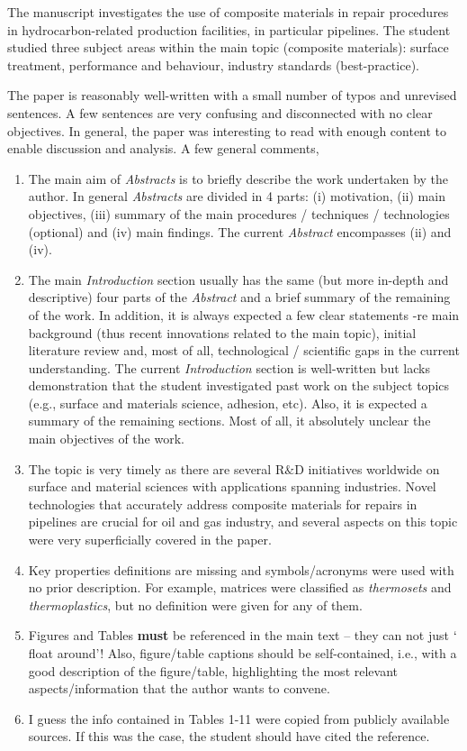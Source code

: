 \documentclass[14pt,twoside]{report}
\begin{document}
\medskip

The manuscript investigates the use of composite materials in repair procedures in hydrocarbon-related production facilities, in particular pipelines. The student studied three subject areas within the main topic (composite materials): surface treatment, performance and behaviour, industry standards (best-practice).

The paper is reasonably well-written with a small number of typos and unrevised sentences. A few sentences are very confusing and disconnected with no clear objectives. In general, the paper was interesting to read with enough content to enable discussion and analysis. A few general comments,
\begin{enumerate}
\item The main aim of {\it Abstracts} is to briefly describe the work undertaken by the author. In general {\it Abstracts} are divided in 4 parts: (i) motivation, (ii) main objectives, (iii) summary of the main procedures / techniques / technologies (optional) and (iv) main findings. The current {\it Abstract} encompasses (ii) and (iv).
%
\item The main {\it Introduction} section usually has the same (but more in-depth and descriptive) four parts of the {\it Abstract} and a brief summary of the remaining of the work. In addition, it is always expected a few clear statements -re main background (thus recent innovations related to the main topic), initial literature review and, most of all, technological / scientific gaps in the current understanding. The current {\it Introduction} section is well-written but lacks demonstration that the student investigated past work on the subject topics (e.g., surface and materials science, adhesion, etc). Also, it is expected a summary of the remaining sections. Most of all, it absolutely unclear the main objectives of the work.
%
\item The topic is very timely as there are several R$\&$D initiatives worldwide on surface and material sciences with applications spanning industries. Novel technologies that accurately address composite materials for repairs in pipelines are crucial for oil and gas industry, and several aspects on this topic were very superficially covered in the paper. 
%
\item Key properties definitions are missing and symbols/acronyms were used with no prior description. For example, matrices were classified as {\it thermosets} and {\it thermoplastics}, but no definition were given for any of them.
%
\item Figures and Tables {\bf must} be referenced in the main text -- they can not just $\lq$float around'! Also, figure/table captions should be self-contained, i.e., with a good description of the figure/table, highlighting the most relevant aspects/information that the author wants to convene. 
%
\item I guess the info contained in Tables 1-11 were copied from publicly available sources. If this was the case, the student should have cited the reference.
\end{enumerate}
\end{document}
